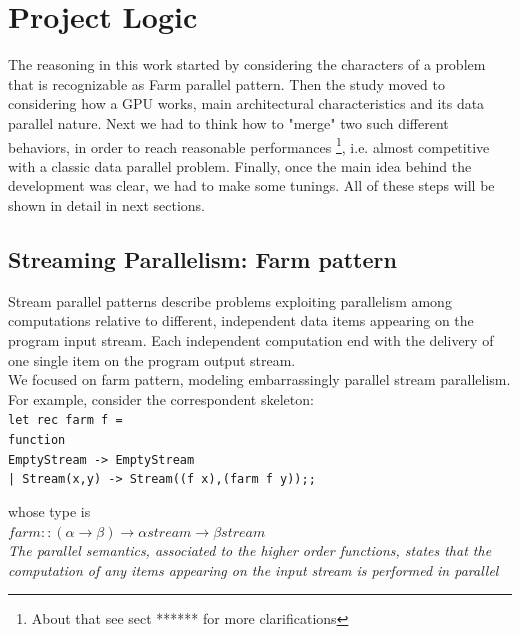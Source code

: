 \chapter{Project Logic}
\label{chap:logic}

The reasoning in this work started by considering the characters of a problem that is recognizable as Farm parallel pattern.
Then the study moved to considering how a GPU works, main architectural characteristics and its data parallel nature.
Next we had to think how to "merge" two such different behaviors, in order to reach reasonable performances \footnote{About that see sect ****** for more clarifications}, i.e. almost competitive with a classic data parallel problem.
Finally, once the main idea behind the development was clear, we had to make some tunings.
All of these steps will be shown in detail in next sections.

\section{Streaming Parallelism: Farm pattern}
Stream parallel patterns describe problems exploiting parallelism among computations relative to
different, independent data items appearing on the program input stream.
Each independent computation end with the delivery of one single item on the program output stream.\\
We focused on farm pattern, modeling embarrassingly parallel stream parallelism. 
For example, consider the correspondent skeleton:\\
\texttt{let rec farm f =\\
	function\\
	EmptyStream -> EmptyStream\\
	| Stream(x,y) -> Stream((f x),(farm f y));;\\
	}
	
whose type is\\
\( farm :: (\alpha \rightarrow \beta) \rightarrow \alpha stream \rightarrow \beta stream \)\\

\textit{The parallel semantics, associated to the higher order functions, states that the computation of any items appearing on the input stream is performed in parallel}\\


